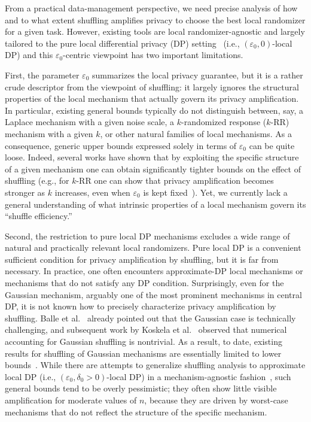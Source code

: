 \documentclass{article}
\theoremstyle{plain}
\theoremstyle{definition}
\begin{document}
From a practical data-management perspective, we need precise analysis of how and to what extent shuffling amplifies privacy to choose the best local randomizer for a given task.
However, existing tools are local randomizer-agnostic and largely tailored to the pure local differential privacy (DP) setting~\cite{ballePrivacyBlanketShuffle2019,erlingssonAmplificationShufflingLocal2019} (i.e., $(\varepsilon_0,0)$-local DP) and this $\varepsilon_0$-centric viewpoint has two important limitations.


First, the parameter $\varepsilon_0$ summarizes the local privacy
guarantee, but it is a rather crude descriptor from the viewpoint of
shuffling: it largely ignores the structural properties of the local
mechanism that actually govern its privacy amplification.
In particular, existing general bounds typically do not distinguish
between, say, a Laplace mechanism with a given noise scale, a
$k$-randomized response ($k$-RR) mechanism with a given $k$, or other
natural families of local mechanisms.
As a consequence, generic upper bounds expressed solely in terms of
$\varepsilon_0$ can be quite loose.
Indeed, several works have shown that by exploiting the specific
structure of a given mechanism one can obtain significantly tighter
bounds on the effect of shuffling
(e.g., for $k$-RR one can show that privacy amplification becomes
stronger as $k$ increases, even when $\varepsilon_0$ is kept
fixed~\cite{feldmanHidingClonesSimple2022,biswasTightDifferentialPrivacy2024}).
Yet, we currently lack a general understanding of what intrinsic
properties of a local mechanism govern its ``shuffle efficiency.''

Second, the restriction to pure local DP mechanisms excludes a
wide range of natural and practically relevant local randomizers.
Pure local DP is a convenient sufficient condition for privacy
amplification by shuffling, but it is far from necessary.
In practice, one often encounters approximate-DP local mechanisms or
mechanisms that do not satisfy any DP condition.
Surprisingly, even for the Gaussian mechanism, arguably one of the most prominent mechanisms in central DP, it is not known how to precisely
characterize privacy amplification by shuffling.
Balle et al.~\cite{ballePrivacyBlanketShuffle2019} already pointed out
that the Gaussian case is technically challenging, and subsequent work
by Koskela et al.~\cite{koskelaNumericalAccountingShuffle2022} observed that numerical accounting for Gaussian shuffling is nontrivial.
As a result, to date, existing results for shuffling of Gaussian mechanisms are essentially limited to lower bounds~\cite{liewShuffleGaussianMechanism2022,chuaHowPrivateAre2024}.
While there are attempts to generalize shuffling analysis to approximate local DP (i.e., $(\varepsilon_0,\delta_0>0)$-local DP) in a mechanism-agnostic fashion~\cite{feldmanHidingClonesSimple2022, cheuDistributedDifferentialPrivacy2019}, such general bounds tend to be overly pessimistic; they often show little visible amplification for moderate values of $n$, because they are driven by worst-case mechanisms that do not reflect the structure of the specific mechanism.
\end{document}
